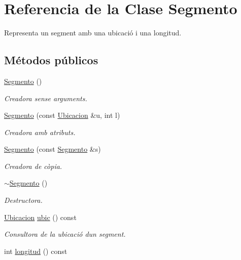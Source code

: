\hypertarget{class_segmento}{}\section{Referencia de la Clase Segmento}
\label{class_segmento}


Representa un segment amb una ubicació i una longitud.  


\subsection*{Métodos públicos}
\begin{DoxyCompactItemize}
\item 
\hyperlink{class_segmento_af8ce1463824db8cd38084f4f75d3b192}{Segmento} ()
\begin{DoxyCompactList}\small\item\em Creadora sense arguments. \end{DoxyCompactList}\item 
\hyperlink{class_segmento_a325e58fb03daa6d14ceeb3c4759b042d}{Segmento} (const \hyperlink{class_ubicacion}{Ubicacion} \&u, int l)
\begin{DoxyCompactList}\small\item\em Creadora amb atributs. \end{DoxyCompactList}\item 
\hyperlink{class_segmento_a18576aa0c0d5d4200e23b84d760b5aa3}{Segmento} (const \hyperlink{class_segmento}{Segmento} \&s)
\begin{DoxyCompactList}\small\item\em Creadora de còpia. \end{DoxyCompactList}\item 
\hyperlink{class_segmento_a7a9ecb38532ea633aacdaa90be7c4769}{$\sim$\+Segmento} ()
\begin{DoxyCompactList}\small\item\em Destructora. \end{DoxyCompactList}\item 
\hyperlink{class_ubicacion}{Ubicacion} \hyperlink{class_segmento_aeb7bfd4dcac3a1a000a33582861e0d50}{ubic} () const
\begin{DoxyCompactList}\small\item\em Consultora de la ubicació d\textquotesingle{}un segment. \end{DoxyCompactList}\item 
int \hyperlink{class_segmento_a61c7347eb37045bef7655d3db24d7fd9}{longitud} () const

\end{DoxyCompactItemize}
